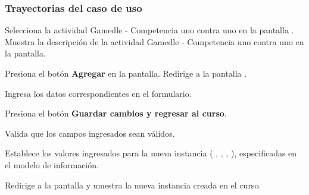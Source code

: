 \begin{UseCase}








\end{UseCase}

\subsubsection{Trayectorias del caso de uso}

\begin{UCtrayectoria}%
%
    \Actor Selecciona la actividad Gamedle - Competencia uno contra uno en la pantalla .
    \Sistema Muestra la descripción de la actividad Gamedle - Competencia uno contra uno en la pantalla.

    \Actor Presiona el botón {\bf Agregar} en la pantalla. 
    \Sistema Redirige a la pantalla .
    \label{CU-C01-muestra-pantalla}

    \Actor Ingresa los datos correspondientes en el formulario.

    \Actor Presiona el botón {\bf Guardar cambios y regresar al curso}. 

    \Sistema Valida que los campos ingresados sean válidos.  

    \Sistema Establece los valores ingresados para la nueva instancia  (
      ,
      ,
      ,
      ), especificadas en el modelo de información.

    \Sistema Redirige a la pantalla  y muestra la nueva instancia creada en el curso.

\end{UCtrayectoria}

